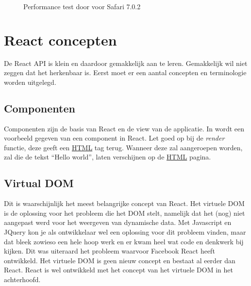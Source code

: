 \begin{figure}
{
		}
		\caption{Performance test door \citeauthor{Harrington:React} voor Safari 7.0.2}%
		\label{fig:ressafari}%
	\end{figure}
	
\section{React concepten}\label{section:rjsconcepten}
		
	De React API is klein en daardoor gemakkelijk aan te leren. Gemakkelijk wil niet zeggen dat het herkenbaar is. Eerst moet er een aantal concepten en terminologie worden uitgelegd.

\subsection{Componenten}
	
	Componenten zijn de basis van React en de view van de applicatie. In  wordt een voorbeeld gegeven van een component in React. Let goed op bij de \emph{render} functie, deze geeft een \hyperref[html]{HTML} tag terug. Wanneer deze zal aangeroepen worden, zal die de tekst ``Hello world'', laten verschijnen op de \hyperref[html]{HTML} pagina.
	

\subsection{Virtual DOM}\label{section:virtualdom}
	
	Dit is waarschijnlijk het meest belangrijke concept van React. Het virtuele DOM is de oplossing voor het probleem die het DOM stelt, namelijk dat het (nog) niet aangepast werd voor het weergeven van dynamische data. Met Javascript en JQuery kon je als ontwikkelaar wel een oplossing voor dit probleem vinden, maar dat bleek zowieso een hele hoop werk en er kwam heel wat code en denkwerk bij kijken. Dit was uiteraard het probleem waarvoor Facebook React heeft ontwikkeld. Het virtuele DOM is geen nieuw concept en bestaat al eerder dan React. React is wel ontwikkeld met het concept van het virtuele DOM in het achterhoofd.
	

